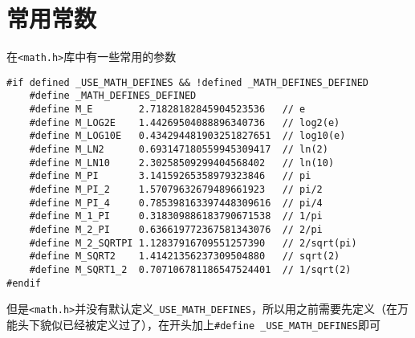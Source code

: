 \section{常用常数}
在\verb|<math.h>|库中有一些常用的参数
\begin{lstlisting}
#if defined _USE_MATH_DEFINES && !defined _MATH_DEFINES_DEFINED
    #define _MATH_DEFINES_DEFINED
    #define M_E        2.71828182845904523536   // e
    #define M_LOG2E    1.44269504088896340736   // log2(e)
    #define M_LOG10E   0.434294481903251827651  // log10(e)
    #define M_LN2      0.693147180559945309417  // ln(2)
    #define M_LN10     2.30258509299404568402   // ln(10)
    #define M_PI       3.14159265358979323846   // pi
    #define M_PI_2     1.57079632679489661923   // pi/2
    #define M_PI_4     0.785398163397448309616  // pi/4
    #define M_1_PI     0.318309886183790671538  // 1/pi
    #define M_2_PI     0.636619772367581343076  // 2/pi
    #define M_2_SQRTPI 1.12837916709551257390   // 2/sqrt(pi)
    #define M_SQRT2    1.41421356237309504880   // sqrt(2)
    #define M_SQRT1_2  0.707106781186547524401  // 1/sqrt(2)
#endif
\end{lstlisting}
但是\verb|<math.h>|并没有默认定义\verb|_USE_MATH_DEFINES|，所以用之前需要先定义（在万能头下貌似已经被定义过了），在开头加上\verb|#define _USE_MATH_DEFINES|即可
